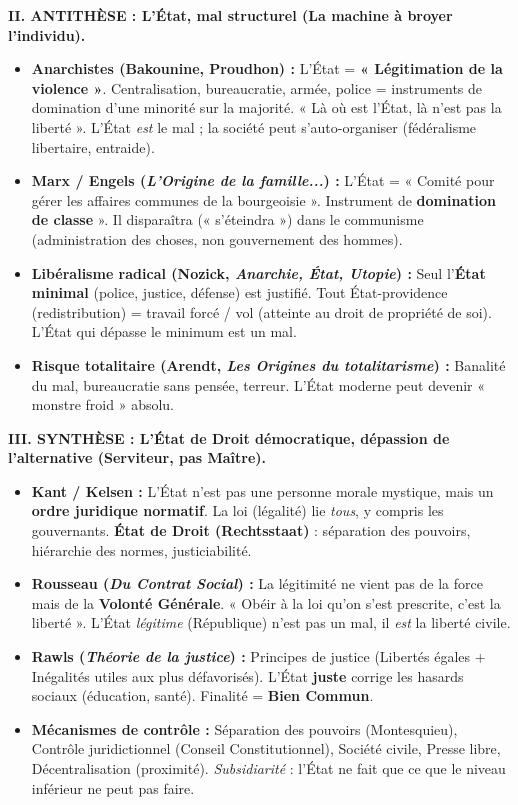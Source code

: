 \documentclass[11pt]{article}
\begin{document}
\begin{exoresolu}
\textbf{II. ANTITHÈSE : L'État, mal structurel (La machine à broyer l'individu).}
\begin{itemize}
    \item \textbf{Anarchistes (Bakounine, Proudhon) :} L'État = \textbf{« Légitimation de la violence »}. Centralisation, bureaucratie, armée, police = instruments de domination d'une minorité sur la majorité. « Là où est l'État, là n'est pas la liberté ». L'État \emph{est} le mal ; la société peut s'auto-organiser (fédéralisme libertaire, entraide).
    \item \textbf{Marx / Engels (\emph{L'Origine de la famille...}) :} L'État = « Comité pour gérer les affaires communes de la bourgeoisie ». Instrument de \textbf{domination de classe} ». Il disparaîtra (« s'éteindra ») dans le communisme (administration des choses, non gouvernement des hommes).
    \item \textbf{Libéralisme radical (Nozick, \emph{Anarchie, État, Utopie}) :} Seul l'\textbf{État minimal} (police, justice, défense) est justifié. Tout État-providence (redistribution) = travail forcé / vol (atteinte au droit de propriété de soi). L'État qui dépasse le minimum est un mal.
    \item \textbf{Risque totalitaire (Arendt, \emph{Les Origines du totalitarisme}) :} Banalité du mal, bureaucratie sans pensée, terreur. L'État moderne peut devenir « monstre froid » absolu.
\end{itemize}

\textbf{III. SYNTHÈSE : L'État de Droit démocratique, dépassion de l'alternative (Serviteur, pas Maître).}
\begin{itemize}
    \item \textbf{Kant / Kelsen :} L'État n'est pas une personne morale mystique, mais un \textbf{ordre juridique normatif}. La loi (légalité) lie \emph{tous}, y compris les gouvernants. \textbf{État de Droit (Rechtsstaat)} : séparation des pouvoirs, hiérarchie des normes, justiciabilité.
    \item \textbf{Rousseau (\emph{Du Contrat Social}) :} La légitimité ne vient pas de la force mais de la \textbf{Volonté Générale}. « Obéir à la loi qu'on s'est prescrite, c'est la liberté ». L'État \emph{légitime} (République) n'est pas un mal, il \emph{est} la liberté civile.
    \item \textbf{Rawls (\emph{Théorie de la justice}) :} Principes de justice (Libertés égales + Inégalités utiles aux plus défavorisés). L'État \textbf{juste} corrige les hasards sociaux (éducation, santé). Finalité = \textbf{Bien Commun}.
    \item \textbf{Mécanismes de contrôle :} Séparation des pouvoirs (Montesquieu), Contrôle juridictionnel (Conseil Constitutionnel), Société civile, Presse libre, Décentralisation (proximité). \emph{Subsidiarité} : l'État ne fait que ce que le niveau inférieur ne peut pas faire.
\end{itemize}


\end{exoresolu}
\end{document}
